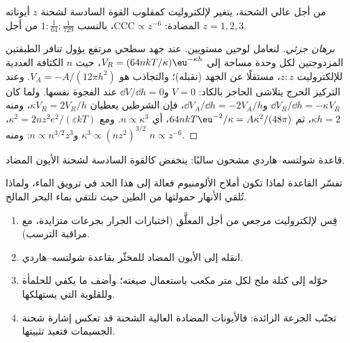 \begin{proposition}\label{prop:b3:colloids:schulze-hardy}
من أجل  عالي الشحنة، يتغير 
لإلكتروليت كمقلوب القوة السادسة لشحنة $z$
أيوناته المضادة: $\text{CCC} \propto z^{-6}$، بالنسب $1 : \frac{1}{64} : \frac{1}{729}$ من أجل $z = 1, 2, 3$.
\end{proposition}

\begin{proof}[برهان جزئي]
لنعامل لوحين مستويين. عند جهد سطحي مرتفع يؤول تنافر الطبقتين المزدوجتين لكل
وحدة مساحة إلى $V_R = (64nkT/\kappa)\eu^{-\kappa h}$، حيث $n$ الكثافة العددية للإلكتروليت $z{:}z$،
مستقلًا عن الجهد (نقبله)؛ والتجاذب هو $V_A =
-A/(12\pi h^2)$. وعند التركيز الحرج يتلاشى الحاجز بالكاد: $V = 0$ و$\dd V/\dd h = 0$ عند
الفجوة نفسها. ولما كان $\dd V_R/\dd h = -\kappa V_R$ و$\dd V_A/\dd h = -2V_A/h$، فإن الشرطين يعطيان
$\kappa V_R = 2V_R/h$، ومنه $\kappa h = 2$، ثم $64nkT\eu^{-2}/\kappa = A\kappa^2/(48\pi)$، أي $n \propto \kappa^3$. ومع
$\kappa^2 = 2nz^2e^2/(\varepsilon kT)$، $\kappa^3 \propto (nz^2)^{3/2}$ و$n \propto n^{3/2}z^3$: ومنه $n \propto z^{-6}$.
\end{proof}

\begin{omfigure}

{\small قاعدة شولتسه--هاردي  مشحون سالبًا: ينخفض  كالقوة السادسة لشحنة الأيون المضاد.}
\end{omfigure}

تفسّر القاعدة لماذا تكون أملاح الألومنيوم فعالة إلى هذا الحد في ترويق الماء، 
ولماذا تُلقي الأنهار حمولتها من الطين حيث تلتقي بماء البحر المالح.

\begin{method}\label{met:b3:colloids:coagulant-dose}
\begin{enumerate}
  \item قِس  لإلكتروليت مرجعي من أجل المعلَّق (اختبارات
        الجرار بجرعات متزايدة، مع مراقبة الترسب).
  \item انقله إلى الأيون المضاد للمخثّر بقاعدة شولتسه--هاردي.
  \item حوّله إلى كتلة ملح لكل متر مكعب باستعمال صيغته؛ وأضف ما يكفي
        للحلمأة وللقلوية التي يستهلكها.
  \item تجنّب الجرعة الزائدة: فالأيونات المضادة العالية الشحنة قد تعكس إشارة
        شحنة الجسيمات فتعيد تثبيتها.
\end{enumerate}
\end{method}

